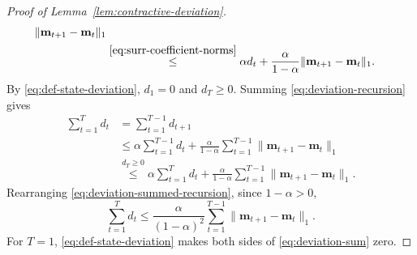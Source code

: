 \documentclass[journal]{IEEEtran}
\theoremstyle{remark}
\begin{document}
\begin{proof}[Proof of Lemma~\ref{lem:contractive-deviation}]
\begin{equation}
\begin{aligned}
\|\mathbf{m}_{t+1}-\mathbf{m}_t\|_1\\
&\overset{\eqref{eq:surr-coefficient-norms}}{\le}\alpha d_t+
\frac{\alpha}{1-\alpha}\|\mathbf{m}_{t+1}-\mathbf{m}_t\|_1.
\end{aligned}
\end{equation}
By \eqref{eq:def-state-deviation}, $d_1=0$ and $d_T\ge0$. Summing
\eqref{eq:deviation-recursion} gives
\begin{equation}
\label{eq:deviation-summed-recursion}
\begin{aligned}
\sum_{t=1}^T d_t
&=\sum_{t=1}^{T-1}d_{t+1}\\
&\le\alpha\sum_{t=1}^{T-1}d_t+
\frac{\alpha}{1-\alpha}
\sum_{t=1}^{T-1}\|\mathbf{m}_{t+1}-\mathbf{m}_t\|_1\\
&\overset{d_T\ge0}{\le}\alpha\sum_{t=1}^{T}d_t+
\frac{\alpha}{1-\alpha}
\sum_{t=1}^{T-1}\|\mathbf{m}_{t+1}-\mathbf{m}_t\|_1.
\end{aligned}
\end{equation}
Rearranging \eqref{eq:deviation-summed-recursion}, since $1-\alpha>0$,
\begin{equation}
\label{eq:deviation-sum}
\sum_{t=1}^T d_t
\le\frac{\alpha}{(1-\alpha)^2}
\sum_{t=1}^{T-1}\|\mathbf{m}_{t+1}-\mathbf{m}_t\|_1.
\end{equation}
For $T=1$, \eqref{eq:def-state-deviation} makes both sides of
\eqref{eq:deviation-sum} zero.


\end{proof}
\end{document}
